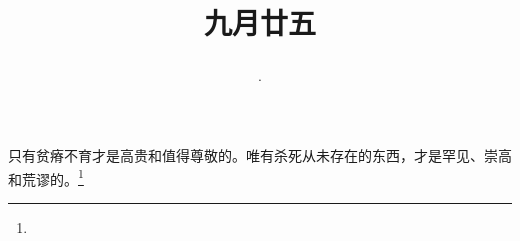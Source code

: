 \title{\date[d=27,m=10,y=2024][year:cn-y,年,month:cn,day:cn,日,·,weekday]·九月廿五 }
只有贫瘠不育才是高贵和值得尊敬的。唯有杀死从未存在的东西，才是罕见、崇高和荒谬的。\footnote{ }


